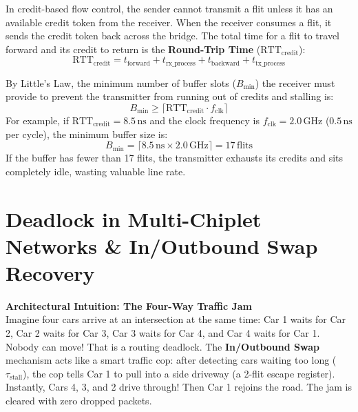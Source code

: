 In credit-based flow control, the sender cannot transmit a flit unless it has an available credit token from the receiver. When the receiver consumes a flit, it sends the credit token back across the bridge. The total time for a flit to travel forward and its credit to return is the \textbf{Round-Trip Time} ($\mathrm{RTT}_{\mathrm{credit}}$):
\begin{equation}
    \mathrm{RTT}_{\mathrm{credit}} = t_{\mathrm{forward}} + t_{\mathrm{rx\_process}} + t_{\mathrm{backward}} + t_{\mathrm{tx\_process}}
    \label{eq:credit-rtt}
\end{equation}

By Little's Law, the minimum number of buffer slots ($B_{\mathrm{min}}$) the receiver must provide to prevent the transmitter from running out of credits and stalling is:
\begin{equation}
    B_{\mathrm{min}} \ge \lceil \mathrm{RTT}_{\mathrm{credit}} \cdot f_{\mathrm{clk}} \rceil
    \label{eq:credit-buffer}
\end{equation}
For example, if $\mathrm{RTT}_{\mathrm{credit}} = 8.5\,\mathrm{ns}$ and the clock frequency is $f_{\mathrm{clk}} = 2.0\,\mathrm{GHz}$ ($0.5\,\mathrm{ns}$ per cycle), the minimum buffer size is:
\begin{equation}
    B_{\mathrm{min}} = \lceil 8.5\,\mathrm{ns} \times 2.0\,\mathrm{GHz} \rceil = 17\,\mathrm{flits}
\end{equation}
If the buffer has fewer than 17 flits, the transmitter exhausts its credits and sits completely idle, wasting valuable line rate.

\section{Deadlock in Multi-Chiplet Networks \& In/Outbound Swap Recovery}
\label{sec:chiplet-deadlocks}

\begin{svgraybox}
\textbf{Architectural Intuition: The Four-Way Traffic Jam} \\
Imagine four cars arrive at an intersection at the same time: Car 1 waits for Car 2, Car 2 waits for Car 3, Car 3 waits for Car 4, and Car 4 waits for Car 1. Nobody can move! That is a routing deadlock. The \textbf{In/Outbound Swap} mechanism acts like a smart traffic cop: after detecting cars waiting too long ($\tau_{\mathrm{stall}}$), the cop tells Car 1 to pull into a side driveway (a 2-flit escape register). Instantly, Cars 4, 3, and 2 drive through! Then Car 1 rejoins the road. The jam is cleared with zero dropped packets.
\end{svgraybox}

